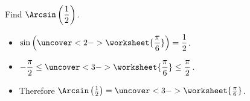 \begin{frame}
\vskip -0.1cm
\begin{example}
\hfil \hfil Find $\displaystyle \Arcsin \left( \frac{1}{2}\right)$.
\begin{itemize}
\item<2->  $\displaystyle \sin \left(\uncover<2->{\worksheet{\frac{\pi}{ 6}}}\right) = \frac{1}{2}$.
\item<3->  $\displaystyle -\frac{\pi}{2} \leq \uncover<3->{\worksheet{\frac{\pi }{6}}} \leq \frac{\pi}{2}$.
\item<4->  Therefore $ \Arcsin \left( \frac{1}{2}\right) = \uncover<3->{ \worksheet{\frac{ \pi }{6} }}$.
\end{itemize}
\end{example}
\end{frame}
